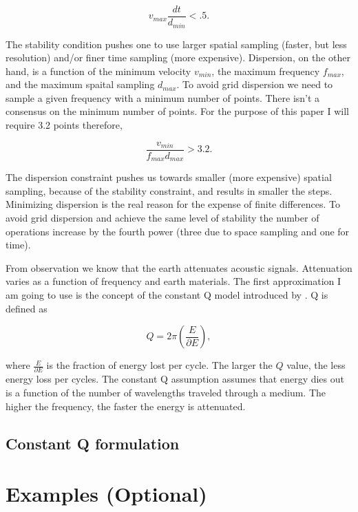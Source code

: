 \documentclass{paris17}
\begin{document}
\begin{equation}
v_{max}\frac{dt}{d_{min}} < .5 \label{eq:stability}.
\end{equation}

The stability condition pushes one to use larger spatial sampling (faster, but less resolution) and/or finer time sampling (more expensive).  Dispersion, on the other hand, is a function of the minimum velocity $v_{min}$, the maximum frequency $f_{max}$, and the maximum spaital sampling $d_{max}$.   To avoid grid dispersion we need to  sample a given frequency with a minimum number of points.  There isn't a consensus on the minimum number
of points. For the purpose of this paper I will require  3.2  points therefore,

\begin{equation}
\frac{v_{min} }{f_{max}d_{max}} > 3.2 \label{eq:dispersion}.
\end{equation}

The dispersion constraint pushes us towards smaller (more expensive) spatial sampling, because of the stability constraint, and results in smaller the steps.  Minimizing dispersion is the real reason for the expense of finite differences.  To avoid grid dispersion and achieve the same level of stability the number of operations increase by the fourth power (three due to space sampling and one for time).

From observation we know that the earth attenuates acoustic signals.  Attenuation varies as a function of frequency and earth materials. The first approximation I am going to use is the concept of the constant Q model introduced by \cite{Kjartansson.sep.23}.  Q is defined as

\begin{equation}
Q=2 \pi \left( \frac{E}{\partial E}\right),
\end{equation}

where $\frac{E}{\partial E}$ is the fraction of energy lost per cycle. The larger the $Q$ value, the less energy loss per cycles.  The constant Q assumption assumes that energy dies out is a function of the number of wavelengths traveled through a medium. The higher the frequency, the faster the energy is attenuated.

\subsection{Constant Q formulation}

\section{Examples (Optional)}
\end{document}
